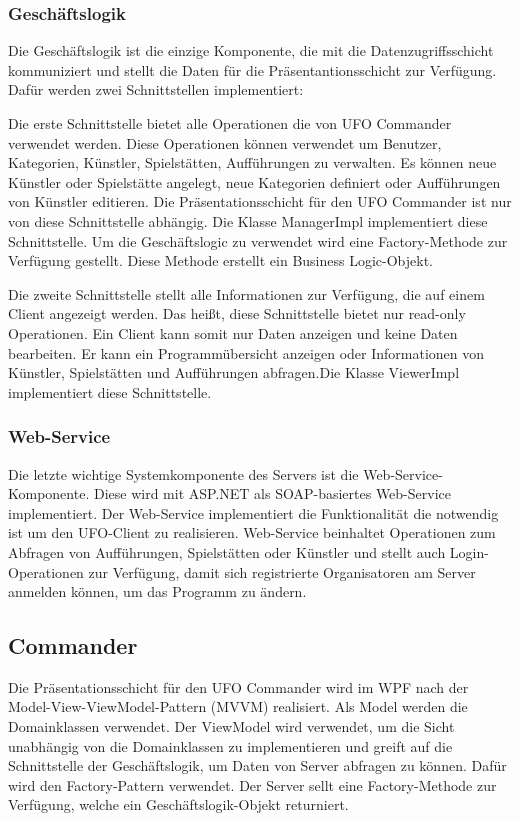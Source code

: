 \documentclass[12pt, a4paper]{article}
\begin{document}
\clearpage
\subsubsection{Geschäftslogik}

Die Geschäftslogik ist die einzige Komponente, die mit die Datenzugriffsschicht kommuniziert und stellt die Daten für die Präsentantionsschicht zur Verfügung. Dafür werden zwei Schnittstellen implementiert:

Die erste Schnittstelle bietet alle Operationen die von UFO Commander verwendet werden. Diese Operationen können verwendet um Benutzer, Kategorien, Künstler, Spielstätten, Aufführungen zu verwalten. 
Es können neue Künstler oder Spielstätte angelegt, neue Kategorien definiert oder Aufführungen von Künstler editieren. Die Präsentationsschicht für den UFO Commander ist nur von diese Schnittstelle abhängig. Die Klasse ManagerImpl implementiert diese Schnittstelle. Um die Geschäftslogic zu verwendet wird eine Factory-Methode zur Verfügung gestellt. Diese Methode erstellt ein Business Logic-Objekt.

Die zweite Schnittstelle stellt alle Informationen zur Verfügung, die auf einem Client angezeigt werden. Das heißt, diese Schnittstelle bietet nur read-only Operationen. Ein Client kann somit nur Daten
anzeigen und keine Daten bearbeiten. Er kann ein Programmübersicht anzeigen oder Informationen von Künstler, Spielstätten und Aufführungen abfragen.Die Klasse ViewerImpl implementiert diese Schnittstelle.

\subsubsection{Web-Service}

Die letzte wichtige Systemkomponente des Servers ist die Web-Service-Komponente. Diese wird mit ASP.NET als SOAP-basiertes Web-Service implementiert. Der Web-Service implementiert die Funktionalität die notwendig ist um den UFO-Client zu realisieren. Web-Service beinhaltet Operationen zum Abfragen von Aufführungen, Spielstätten oder Künstler und stellt auch Login-Operationen zur Verfügung, damit sich registrierte Organisatoren am Server anmelden können, um das Programm zu ändern. 

\subsection{Commander}

Die Präsentationsschicht für den UFO Commander wird im WPF nach der Model-View-ViewModel-Pattern (MVVM) realisiert. Als Model werden die Domainklassen verwendet. Der ViewModel wird verwendet, um die Sicht unabhängig von die Domainklassen zu implementieren und greift auf die  Schnittstelle der Geschäftslogik, um Daten von Server abfragen zu können. Dafür wird den Factory-Pattern verwendet. Der Server sellt eine Factory-Methode zur Verfügung, welche ein Geschäftslogik-Objekt returniert.
\end{document}
